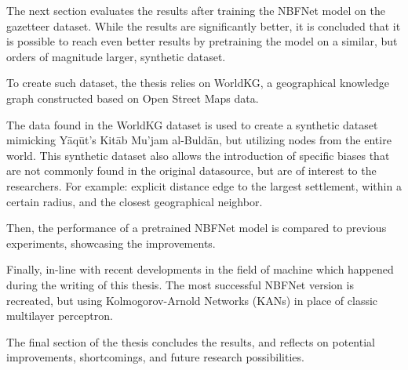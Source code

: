 The next section evaluates the results after training the NBFNet model on the gazetteer dataset.
While the results are significantly better, it is concluded that it is possible to reach even better results
by pretraining the model on a similar, but orders of magnitude larger, synthetic dataset.

To create such dataset, the thesis relies on WorldKG, a geographical knowledge graph constructed based on Open Street
Maps data.

The data found in the WorldKG dataset is used to create a synthetic dataset mimicking Yāqūt's Kitāb Mu'jam al-Buldān,
but utilizing nodes from the entire world.
This synthetic dataset also allows the introduction of specific biases that are not commonly found in the original datasource,
but are of interest to the researchers.
For example: explicit distance edge to the largest settlement, within a certain radius, and the closest geographical neighbor.

Then, the performance of a pretrained NBFNet model is compared to previous experiments, showcasing the improvements.

Finally, in-line with recent developments in the field of machine which happened during the writing of this thesis.
The most successful NBFNet version is recreated, but using Kolmogorov-Arnold Networks (KANs) in place of classic multilayer
perceptron.

The final section of the thesis concludes the results, and reflects on potential improvements, shortcomings, and future
research possibilities.





